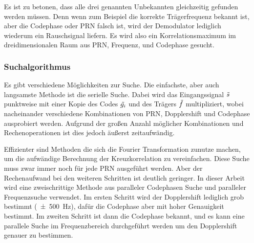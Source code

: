 Es ist zu betonen, dass alle drei genannten Unbekannten gleichzeitig gefunden werden müssen. Denn wenn zum Beispiel die korrekte Trägerfrequenz bekannt ist, aber die Codephase oder PRN falsch ist, wird der Demodulator lediglich wiederum ein Rauschsignal liefern. Es wird also ein Korrelationsmaximum im dreidimensionalen Raum aus PRN, Frequenz, und Codephase gesucht.

\subsubsection{Suchalgorithmus}
Es gibt verschiedene Möglichkeiten zur Suche. Die einfachste, aber auch langsamste Methode ist die serielle Suche. Dabei wird das Eingangssignal $\tilde{s}$ punktweise mit einer Kopie des Codes $\tilde{g_i}$ und des Trägers $\tilde{f}$ multipliziert, wobei nacheinander verschiedene Kombinationen von \gls{PRN}, Dopplershift und Codephase ausprobiert werden. Aufgrund der großen Anzahl möglicher Kombinationen und Rechenoperationen ist dies jedoch äußerst zeitaufwändig.

Effizienter sind Methoden die sich die Fourier Transformation zunutze machen, um die aufwändige Berechnung der Kreuzkorrelation zu vereinfachen. Diese Suche muss zwar immer noch für jede PRN ausgeführt werden. Aber der Rechenaufwand bei den weiteren Schritten ist deutlich geringer. 
In dieser Arbeit wird eine zweischrittige Methode aus paralleler Codephasen Suche und paralleler Frequenzsuche verwendet. Im ersten Schritt wird der Dopplershift lediglich grob bestimmt (\SI{\pm500}{\Hz}), dafür die Codephase aber mit hoher Genauigkeit bestimmt. Im zweiten Schritt ist dann die Codephase bekannt, und es kann eine parallele Suche im Frequenzbereich durchgeführt werden um den Dopplershift genauer zu bestimmen. 




